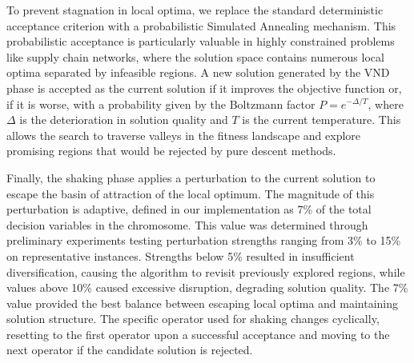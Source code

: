 \documentclass[preprint,12pt,authoryear]{elsarticle}
\begin{document}
To prevent stagnation in local optima, we replace the standard deterministic acceptance criterion with a probabilistic Simulated Annealing mechanism. This probabilistic acceptance 
is particularly valuable in highly constrained problems like supply chain networks, where the solution space contains numerous local optima separated by infeasible regions. 
A new solution generated by the VND phase is accepted as the current solution if it improves the objective function or, if it is worse, with a probability given by the 
Boltzmann factor $P = e^{-\Delta / T}$, where $\Delta$ is the deterioration in solution quality and $T$ is the current temperature. This allows the search to traverse valleys 
in the fitness landscape and explore promising regions that would be rejected by pure descent methods.

Finally, the shaking phase applies a perturbation to the current solution to escape the basin of attraction of the local optimum. The magnitude of this perturbation is adaptive, 
defined in our implementation as 7\% of the total decision variables in the chromosome. This value was determined through preliminary experiments testing perturbation strengths 
ranging from 3\% to 15\% on representative instances. Strengths below 5\% resulted in insufficient diversification, causing the algorithm to revisit previously explored regions, 
while values above 10\% caused excessive disruption, degrading solution quality. The 7\% value provided the best balance between escaping local optima and maintaining solution 
structure. The specific operator used for shaking changes cyclically, resetting to the first operator upon a successful acceptance and 
moving to the next operator if the candidate solution is rejected.
\end{document}
